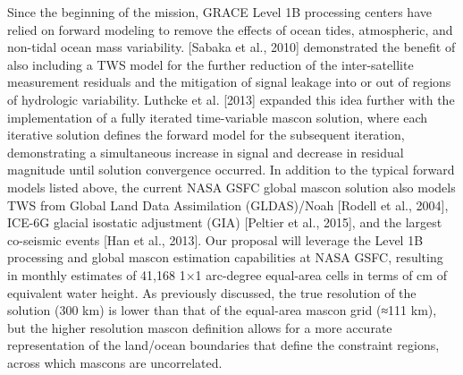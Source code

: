 \documentclass[review,oneside]{igs}
\begin{document}
Since the beginning of the mission, GRACE Level 1B processing centers have relied on forward modeling to remove the effects of ocean tides, atmospheric, and non-tidal ocean mass variability. [Sabaka et al., 2010] demonstrated the benefit of also including a TWS model for the further reduction of the inter-satellite measurement residuals and the mitigation of signal leakage into or out of regions of hydrologic variability. Luthcke et al. [2013] expanded this idea further with the implementation of a fully iterated time-variable mascon solution, where each iterative solution defines the forward model for the subsequent iteration, demonstrating a simultaneous increase in signal and decrease in residual magnitude until solution convergence occurred. In addition to the typical forward models listed above, the current NASA GSFC global mascon solution also models TWS from Global Land Data Assimilation (GLDAS)/Noah [Rodell et al., 2004], ICE-6G glacial isostatic adjustment (GIA) [Peltier et al., 2015], and the largest co-seismic events [Han et al., 2013]. Our proposal will leverage the Level 1B processing and global mascon estimation capabilities at NASA GSFC, resulting in monthly estimates of 41,168 1×1 arc-degree equal-area cells in terms of cm of equivalent water height. As previously discussed, the true resolution of the solution (300 km) is lower than that of the equal-area mascon grid (≈111 km), but the higher resolution mascon definition allows for a more accurate representation of the land/ocean boundaries that define the constraint regions, across which mascons are uncorrelated.
\end{document}
